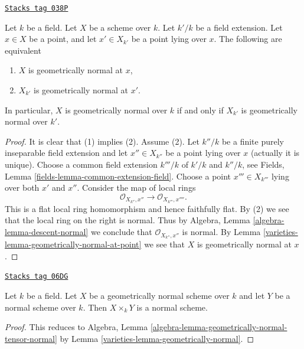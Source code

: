 \begin{lemma}
\label{varieties-lemma-geometrically-normal-upstairs}
\href{https://stacks.math.columbia.edu/tag/038P}{\texttt{Stacks tag 038P}}

Let $k$ be a field.
Let $X$ be a scheme over $k$.
Let $k'/k$ be a field extension.
Let $x \in X$ be a point, and let $x' \in X_{k'}$ be a point lying over $x$.
The following are equivalent
\begin{enumerate}
\item $X$ is geometrically normal at $x$,
\item $X_{k'}$ is geometrically normal at $x'$.
\end{enumerate}
In particular, $X$ is geometrically normal over $k$ if and only if
$X_{k'}$ is geometrically normal over $k'$.
\end{lemma}

\begin{proof}

It is clear that (1) implies (2). Assume (2).
Let $k''/k$ be a finite purely inseparable field extension
and let $x'' \in X_{k''}$ be a point lying over $x$ (actually it is
unique). Choose a common field extension $k'''/k$ of $k'/k$
and $k''/k$, see Fields, Lemma \ref{fields-lemma-common-extension-field}.
Choose a point $x''' \in X_{k'''}$ lying over both $x'$ and $x''$.
Consider the map of local rings
$$
\mathcal{O}_{X_{k''}, x''} \longrightarrow \mathcal{O}_{X_{k'''}, x''''}.
$$
This is a flat local ring homomorphism and hence faithfully flat.
By (2) we see that the local ring on the right is normal.
Thus by Algebra, Lemma \ref{algebra-lemma-descent-normal}
we conclude that $\mathcal{O}_{X_{k''}, x''}$ is normal.
By Lemma \ref{varieties-lemma-geometrically-normal-at-point} we see that $X$
is geometrically normal at $x$.
\end{proof}

\begin{lemma}
\label{varieties-lemma-fibre-product-normal}
\href{https://stacks.math.columbia.edu/tag/06DG}{\texttt{Stacks tag 06DG}}

Let $k$ be a field. Let $X$ be a geometrically normal scheme over $k$
and let $Y$ be a normal scheme over $k$. Then $X \times_k Y$ is a normal
scheme.
\end{lemma}

\begin{proof}

This reduces to
Algebra, Lemma \ref{algebra-lemma-geometrically-normal-tensor-normal}
by
Lemma \ref{varieties-lemma-geometrically-normal}.
\end{proof}

